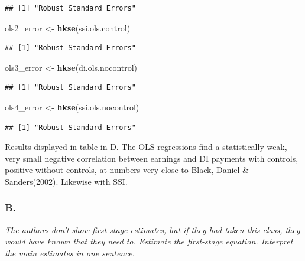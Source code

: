 \documentclass[
]{article}
\newenvironment{Shaded}{\begin{snugshade}}{\end{snugshade}}
\newcommand{\KeywordTok}[1]{\textcolor[rgb]{0.13,0.29,0.53}{\textbf{#1}}}
\newcommand{\NormalTok}[1]{#1}
\newcommand{\StringTok}[1]{\textcolor[rgb]{0.31,0.60,0.02}{#1}}
\begin{document}
\begin{verbatim}
## [1] "Robust Standard Errors"
\end{verbatim}

\begin{Shaded}
\begin{Highlighting}[]
\NormalTok{ols2_error <-}\StringTok{ }\KeywordTok{hkse}\NormalTok{(ssi.ols.control)}
\end{Highlighting}
\end{Shaded}

\begin{verbatim}
## [1] "Robust Standard Errors"
\end{verbatim}

\begin{Shaded}
\begin{Highlighting}[]
\NormalTok{ols3_error <-}\StringTok{ }\KeywordTok{hkse}\NormalTok{(di.ols.nocontrol)}
\end{Highlighting}
\end{Shaded}

\begin{verbatim}
## [1] "Robust Standard Errors"
\end{verbatim}

\begin{Shaded}
\begin{Highlighting}[]
\NormalTok{ols4_error <-}\StringTok{ }\KeywordTok{hkse}\NormalTok{(ssi.ols.nocontrol)}
\end{Highlighting}
\end{Shaded}

\begin{verbatim}
## [1] "Robust Standard Errors"
\end{verbatim}

Results displayed in table in D. The OLS regressions find a
statistically weak, very small negative correlation between earnings and
DI payments with controls, positive without controls, at numbers very
close to Black, Daniel \& Sanders(2002). Likewise with SSI.

\hypertarget{b.-7}{%
\subsubsection{B.}\label{b.-7}}

\textit{The authors don’t show first-stage estimates, but if they had taken this class, they would have known that they need to. Estimate the first-stage equation. Interpret the main estimates in one sentence.}
\end{document}
